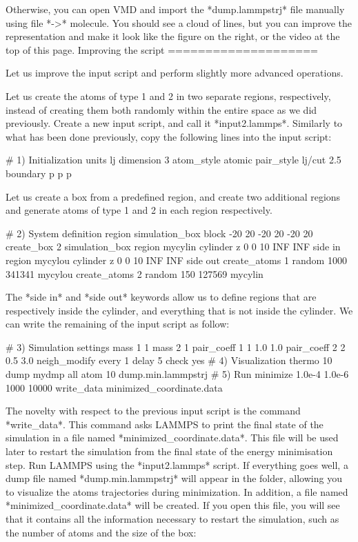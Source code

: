 Otherwise, you can open VMD and import the *dump.lammpstrj*
file manually using file *->* molecule. You should see a cloud
of lines, but you can improve the representation and make it
look like the figure on the right, or the video at the 
top of this page. 
Improving the script
====================

Let us improve the input script and perform slightly more
advanced operations.

Let us create the atoms of type 1 and 2 in two separate
regions, respectively, instead of creating them both randomly 
within the entire space as we did previously. Create a new input script, and call
it *input2.lammps*. Similarly to what has been done previously, copy the following lines
into the input script:

\begin{lcverbatim}
# 1) Initialization
units lj
dimension 3
atom_style atomic
pair_style lj/cut 2.5
boundary p p p
\end{lcverbatim}

Let us create a box from a predefined region,
and create two additional regions and generate
atoms of type 1 and 2 in each region respectively.

\begin{lcverbatim}
# 2) System definition
region simulation_box block -20 20 -20 20 -20 20
create_box 2 simulation_box
region mycylin cylinder z 0 0 10 INF INF side in
region mycylou cylinder z 0 0 10 INF INF side out
create_atoms 1 random 1000 341341 mycylou
create_atoms 2 random 150 127569 mycylin
\end{lcverbatim}

The *side in* and *side out* keywords
allow us to define regions that are respectively inside the
cylinder, and everything that is not inside the cylinder.
We can write the remaining of the input script as follow:

\begin{lcverbatim}
# 3) Simulation settings
mass 1 1
mass 2 1
pair_coeff 1 1 1.0 1.0
pair_coeff 2 2 0.5 3.0
neigh_modify every 1 delay 5 check yes
# 4) Visualization
thermo 10
dump mydmp all atom 10 dump.min.lammpstrj
# 5) Run
minimize 1.0e-4 1.0e-6 1000 10000
write_data minimized_coordinate.data
\end{lcverbatim}

The novelty with respect to the previous
input script is the command *write_data*. This command
asks LAMMPS to print the final state of the simulation in
a file named *minimized_coordinate.data*. This file will
be used later to restart the simulation from the final
state of the energy minimisation step.
Run LAMMPS using the *input2.lammps* script. If everything
goes well, a dump file named *dump.min.lammpstrj* will
appear in the folder, allowing you to visualize the atoms
trajectories during minimization. In
addition, a file named *minimized_coordinate.data* will be
created. If you open this file, you will see that it
contains all the information necessary to restart the
simulation, such as the number of atoms and the size of
the box:


